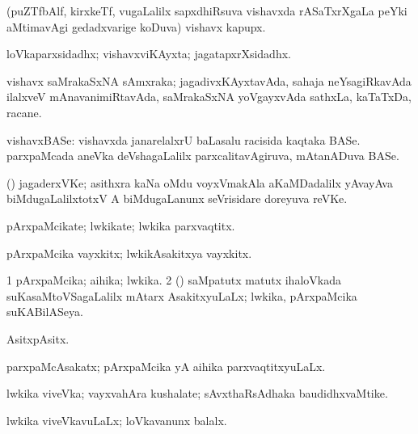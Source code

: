 \bentry
{} 
\gl{\nA}
\expl{}
\bmng
(puZTfbAlf, kirxkeTf, \mo vugaLalilx sapxdhiRsuva vishavxda rASaTxrXgaLa peYki aMtimavAgi gedadxvarige koDuva) vishavx kapupx. 
\emng
\eentry

\bentry
{} 
\gl{\gu}
\expl{}
\bmng
loVkaparxsidadhx; vishavxviKAyxta; jagatapxrXsidadhx. 
\emng
\eentry

\bentry
{} 
\gl{\nA}
\expl{}
\bmng
vishavx saMrakaSxNA sAmxraka; jagadivxKAyxtavAda, sahaja neYsagiRkavAda ilalxveV mAnavanimiRtavAda, saMrakaSxNA yoVgayxvAda sathxLa, kaTaTxDa, racane. 
\emng
\eentry

\bentry
{} 
\gl{\nA}
\expl{}
\bmng
vishavxBASe: 
\banum
{} vishavxda janarelalxrU baLasalu racisida kaqtaka BASe. 
 parxpaMcada aneVka deVshagaLalilx parxcalitavAgiruva, mAtanADuva BASe. 
\eanum
\emng
\eentry

\bentry
{} 
\gl{\nA}
\expl{}
\bmng
(\Bwvi) jagaderxVKe; asithxra kaNa oMdu voyxVmakAla  aKaMDadalilx yAvayAva biMdugaLalilxtotxV A biMdugaLanunx seVrisidare doreyuva reVKe. 
\emng
\eentry

\bentry
{} 
\gl{\nA}
\expl{}
\bmng
pArxpaMcikate; lwkikate; lwkika parxvaqtitx. 
\emng
\eentry

\bentry
{} 
\gl{\nA}
\expl{}
\bmng
pArxpaMcika vayxkitx; lwkikAsakitxya vayxkitx. 
\emng
\eentry

\bentry
{} 
\gl{\gu}
\bmng
\bnum
\num{1} pArxpaMcika; aihika; lwkika. 
\num{2} (\kanmu) saMpatutx matutx ihaloVkada suKasaMtoVSagaLalilx mAtarx AsakitxyuLaLx; lwkika, pArxpaMcika suKABilASeya. 
\enum
\emng

\noindent 
\gl{\pagu}
\expl{}
\bmng
{} AsitxpAsitx. 
\emng
\eentry

\bentry
{} 
\gl{\gu}
\expl{}
\bmng
parxpaMcAsakatx; pArxpaMcika yA aihika parxvaqtitxyuLaLx. 
\emng
\eentry

\bentry
{} 
\gl{\nA}
\expl{}
\bmng
lwkika viveVka; vayxvahAra kushalate; sAvxthaRsAdhaka baudidhxvaMtike. 
\emng
\eentry

\bentry
{} 
\gl{\gu}
\expl{}
\bmng
lwkika viveVkavuLaLx; loVkavanunx balalx. 
\emng
\eentry

